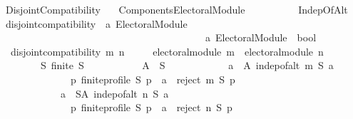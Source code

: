 %
\begin{isabellebody}%
%
%
\isadelimtheory
%
\endisadelimtheory
%
\isatagtheory
{}\isamarkupfalse%
\ Disjoint{\isacharunderscore}{\kern0pt}Compatibility\isanewline
\ \ \ {\isachardoublequoteopen}{\isachardot}{\kern0pt}{\isachardot}{\kern0pt}{\isacharslash}{\kern0pt}Components{\isacharslash}{\kern0pt}Electoral{\isacharunderscore}{\kern0pt}Module{\isachardoublequoteclose}\isanewline
\ \ \ \ \ \ \ \ \ \ Indep{\isacharunderscore}{\kern0pt}Of{\isacharunderscore}{\kern0pt}Alt\isanewline
\isanewline
{}%
\endisatagtheory
{\isafoldtheory}%
%
\isadelimtheory
\isanewline
%
\endisadelimtheory
\isanewline
\isanewline
{}\isamarkupfalse%
\ disjoint{\isacharunderscore}{\kern0pt}compatibility\ {\isacharcolon}{\kern0pt}{\isacharcolon}{\kern0pt}\ {\isachardoublequoteopen}{\isacharprime}{\kern0pt}a\ Electoral{\isacharunderscore}{\kern0pt}Module\ {\isasymRightarrow}\isanewline
\ \ \ \ \ \ \ \ \ \ \ \ \ \ \ \ \ \ \ \ \ \ \ \ \ \ \ \ \ \ \ \ \ \ \ \ \ \ \ \ \ {\isacharprime}{\kern0pt}a\ Electoral{\isacharunderscore}{\kern0pt}Module\ {\isasymRightarrow}\ bool{\isachardoublequoteclose}\ \isanewline
\ \ {\isachardoublequoteopen}disjoint{\isacharunderscore}{\kern0pt}compatibility\ m\ n\ {\isasymequiv}\isanewline
\ \ \ \ electoral{\isacharunderscore}{\kern0pt}module\ m\ {\isasymand}\ electoral{\isacharunderscore}{\kern0pt}module\ n\ {\isasymand}\isanewline
\ \ \ \ \ \ \ \ {\isacharparenleft}{\kern0pt}{\isasymforall}S{\isachardot}{\kern0pt}\ finite\ S\ {\isasymlongrightarrow}\isanewline
\ \ \ \ \ \ \ \ \ \ {\isacharparenleft}{\kern0pt}{\isasymexists}A\ {\isasymsubseteq}\ S{\isachardot}{\kern0pt}\isanewline
\ \ \ \ \ \ \ \ \ \ \ \ {\isacharparenleft}{\kern0pt}{\isasymforall}a\ {\isasymin}\ A{\isachardot}{\kern0pt}\ indep{\isacharunderscore}{\kern0pt}of{\isacharunderscore}{\kern0pt}alt\ m\ S\ a\ {\isasymand}\isanewline
\ \ \ \ \ \ \ \ \ \ \ \ \ \ {\isacharparenleft}{\kern0pt}{\isasymforall}p{\isachardot}{\kern0pt}\ finite{\isacharunderscore}{\kern0pt}profile\ S\ p\ {\isasymlongrightarrow}\ a\ {\isasymin}\ reject\ m\ S\ p{\isacharparenright}{\kern0pt}{\isacharparenright}{\kern0pt}\ {\isasymand}\isanewline
\ \ \ \ \ \ \ \ \ \ \ \ {\isacharparenleft}{\kern0pt}{\isasymforall}a\ {\isasymin}\ S{\isacharminus}{\kern0pt}A{\isachardot}{\kern0pt}\ indep{\isacharunderscore}{\kern0pt}of{\isacharunderscore}{\kern0pt}alt\ n\ S\ a\ {\isasymand}\isanewline
\ \ \ \ \ \ \ \ \ \ \ \ \ \ {\isacharparenleft}{\kern0pt}{\isasymforall}p{\isachardot}{\kern0pt}\ finite{\isacharunderscore}{\kern0pt}profile\ S\ p\ {\isasymlongrightarrow}\ a\ {\isasymin}\ reject\ n\ S\ p{\isacharparenright}{\kern0pt}{\isacharparenright}{\kern0pt}{\isacharparenright}{\kern0pt}{\isacharparenright}{\kern0pt}{\isachardoublequoteclose}\isanewline
%
\isadelimtheory
\isanewline
%
\endisadelimtheory
%
\isatagtheory
{}\isamarkupfalse%
%
\endisatagtheory
{\isafoldtheory}%
%
\isadelimtheory
%
\endisadelimtheory
%
\end{isabellebody}%
